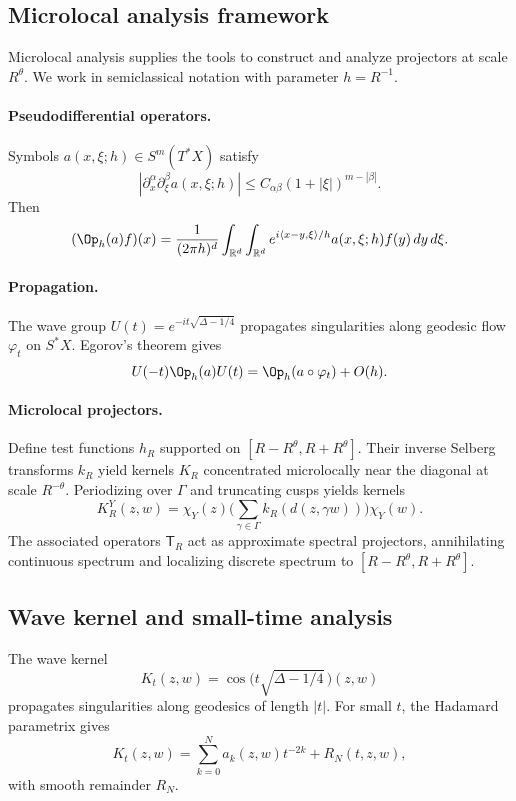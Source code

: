 \subsection{Microlocal analysis framework}\label{subsec:microlocal}

Microlocal analysis supplies the tools to construct and analyze projectors at scale $R^\theta$. We work in semiclassical notation with parameter $h=R^{-1}$.

\paragraph{Pseudodifferential operators.}
Symbols $a(x,\xi;h)\in S^m(T^*X)$ satisfy
\[
|\partial_x^\alpha\partial_\xi^\beta a(x,\xi;h)| \le C_{\alpha\beta}(1+|\xi|)^{m-|\beta|}.
\]
Then
\[
(\Op_h(a)f)(x) = \frac{1}{(2\pi h)^d}\int_{\RR^d}\int_{\RR^d} e^{i\langle x-y,\xi\rangle/h}a(x,\xi;h)f(y)\,dy\,d\xi.
\]

\paragraph{Propagation.}
The wave group $U(t) = e^{-it\sqrt{\Delta-1/4}}$ propagates singularities along geodesic flow $\varphi_t$ on $S^*X$. Egorov’s theorem gives
\[
U(-t)\Op_h(a)U(t) = \Op_h(a\circ\varphi_t) + O(h).
\]

\paragraph{Microlocal projectors.}
Define test functions $h_R$ supported on $[R-R^\theta, R+R^\theta]$. Their inverse Selberg transforms $k_R$ yield kernels $K_R$ concentrated microlocally near the diagonal at scale $R^{-\theta}$. Periodizing over $\Gamma$ and truncating cusps yields kernels
\[
K_R^Y(z,w) = \chi_Y(z) \Big(\sum_{\gamma\in\Gamma} k_R(d(z,\gamma w))\Big)\chi_Y(w).
\]
The associated operators $\mathsf{T}_R$ act as approximate spectral projectors, annihilating continuous spectrum and localizing discrete spectrum to $[R-R^\theta,R+R^\theta]$.

\subsection{Wave kernel and small-time analysis}\label{subsec:wave}

The wave kernel
\[
K_t(z,w) = \cos\!\big(t\sqrt{\Delta-1/4}\,\big)(z,w)
\]
propagates singularities along geodesics of length $|t|$. For small $t$, the Hadamard parametrix gives
\[
K_t(z,w) = \sum_{k=0}^N a_k(z,w) t^{-2k} + R_N(t,z,w),
\]
with smooth remainder $R_N$.

